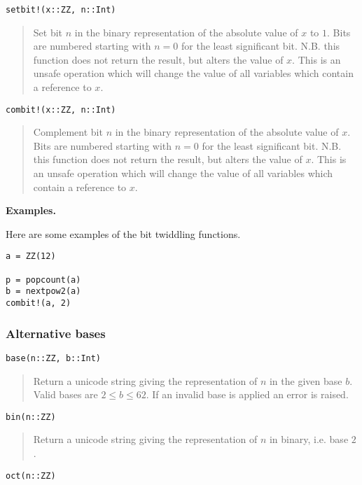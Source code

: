 \documentclass[a4paper,10pt]{article}
\newcommand{\desc}[1]{\vspace{-3mm}\begin{quote}#1\end{quote}}
\begin{document}
{{{\begin{lstlisting}
setbit!(x::ZZ, n::Int)
\end{lstlisting}

\desc{Set bit $n$ in the binary representation of the absolute value of $x$ to $1$. Bits
are numbered starting with $n = 0$ for the least significant bit. N.B. this function does
not return the result, but alters the value of $x$. This is an unsafe operation which will
change the value of all variables which contain a reference to $x$.}

\begin{lstlisting}
combit!(x::ZZ, n::Int)
\end{lstlisting}

\desc{Complement bit $n$ in the binary representation of the absolute value of $x$. Bits
are numbered starting with $n = 0$ for the least significant bit. N.B. this function does
not return the result, but alters the value of $x$. This is an unsafe operation which will
change the value of all variables which contain a reference to $x$.}

\textbf{Examples.}

Here are some examples of the bit twiddling functions.

\begin{lstlisting}
a = ZZ(12)

p = popcount(a)
b = nextpow2(a)
combit!(a, 2)
\end{lstlisting}

\subsubsection{Alternative bases}

\begin{lstlisting}
base(n::ZZ, b::Int)
\end{lstlisting}

\desc{Return a unicode string giving the representation of $n$ in the given base $b$. Valid
bases are $2 \leq b \leq 62$. If an invalid base is applied an error is raised.}

\begin{lstlisting}
bin(n::ZZ)
\end{lstlisting}

\desc{Return a unicode string giving the representation of $n$ in binary, i.e. base $2$.}

\begin{lstlisting}
oct(n::ZZ)
\end{lstlisting}

}}}
\end{document}
